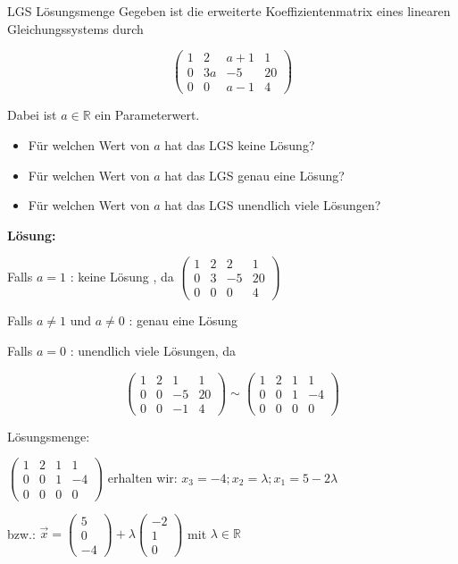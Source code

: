 \begin{example2}{LGS Lösungsmenge}
    Gegeben ist die erweiterte Koeffizientenmatrix eines linearen Gleichungssystems durch

    $$
    \left(\begin{array}{ccc|c}
    1 & 2 & a+1 & 1 \\
    0 & 3 a & -5 & 20 \\
    0 & 0 & a-1 & 4
    \end{array}\right)
    $$

    Dabei ist $a \in \mathbb{R}$ ein Parameterwert.

    \begin{itemize}
        \item Für welchen Wert von $a$ hat das LGS keine Lösung?
        \item Für welchen Wert von $a$ hat das LGS genau eine Lösung?
        \item Für welchen Wert von $a$ hat das LGS unendlich viele Lösungen?
    \end{itemize}

    \textbf{Lösung:}

    Falls $a=1$ : keine Lösung , da $\left(\begin{array}{ccc|c}1 & 2 & 2 & 1 \\ 0 & 3 & -5 & 20 \\ 0 & 0 & 0 & 4\end{array}\right)$

    Falls $a \neq 1$ und $a \neq 0$ : genau eine Lösung

    Falls $a=0$ : unendlich viele Lösungen, da

    $$
    \left(\begin{array}{ccc|c}
    1 & 2 & 1 & 1 \\
    0 & 0 & -5 & 20 \\
    0 & 0 & -1 & 4
    \end{array}\right) \sim\left(\begin{array}{ccc|c}
    1 & 2 & 1 & 1 \\
    0 & 0 & 1 & -4 \\
    0 & 0 & 0 & 0
    \end{array}\right)
    $$

    Lösungsmenge:

    $\left(\begin{array}{ccc|c}1 & 2 & 1 & 1 \\ 0 & 0 & 1 & -4 \\ 0 & 0 & 0 & 0\end{array}\right)$ erhalten wir: $x_{3}=-4 ; x_{2}=\lambda ; x_{1}=5-2 \lambda$

    bzw.: $\vec{x}=\left(\begin{array}{c}5 \\ 0 \\ -4\end{array}\right)+\lambda\left(\begin{array}{c}-2 \\ 1 \\ 0\end{array}\right)$ mit $\lambda \in \mathbb{R}$

\end{example2}

